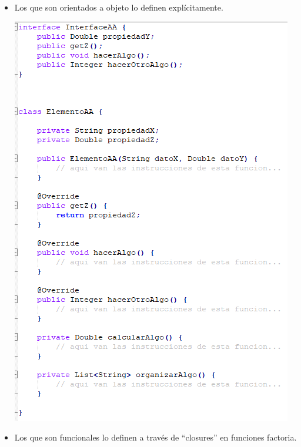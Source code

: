\documentclass[spanish,12pt,a4paper,final,oneside]{book}
\begin{document}
\begin{itemize}

\item Los que son orientados a objeto lo definen explícitamente.

\includegraphics[scale=1]{encapsulacion en paradigma orientado a objeto}

\newpage
\item Los que son funcionales lo definen a través de ``closures'' en funciones factoria.


\end{itemize}
\end{document}
